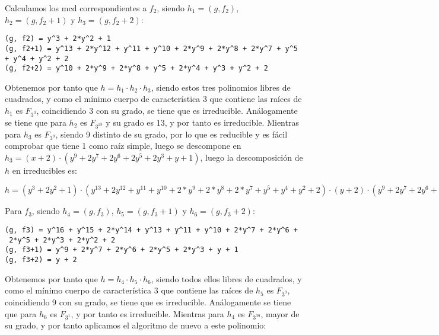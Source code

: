 \documentclass[a4paper]{article}
\begin{document}
Calculamos los mcd correspondientes a $f_2$, siendo $h_1=(g,f_2)$, $h_2=(g,f_2+1)$ y $h_3=(g,f_2+2)$:

\begin{verbatim}
(g, f2) = y^3 + 2*y^2 + 1
(g, f2+1) = y^13 + 2*y^12 + y^11 + y^10 + 2*y^9 + 2*y^8 + 2*y^7 + y^5 + y^4 + y^2 + 2
(g, f2+2) = y^10 + 2*y^9 + 2*y^8 + y^5 + 2*y^4 + y^3 + y^2 + 2
\end{verbatim}

Obtenemos por tanto que $h=h_1\cdot h_2\cdot h_3$, siendo estos tres polinomios libres de cuadrados, y como el mínimo cuerpo de característica 3 que contiene las raíces de $h_1$ es $F_{3^{3}}$, coincidiendo 3 con su grado, se tiene que es irreducible. Análogamente se tiene que para $h_2$ es $F_{3^{13}}$ y su grado es 13, y por tanto es irreducible. Mientras para $h_3$ es $F_{3^{9}}$, siendo 9 distinto de su grado, por lo que es reducible y es fácil comprobar que tiene 1 como raíz simple, luego se descompone en $h_3=(x+2)\cdot (y^9+2y^7+2y^6+2y^5+2y^3+y+1)$, luego la descomposición de $h$ en irreducibles es:

$h = (y^3 + 2y^2 + 1)\cdot (y^{13} + 2y^{12} + y^{11} + y^{10} + 2*y^9 + 2*y^8 + 2*y^7 + y^5 + y^4 + y^2 + 2)\cdot (y+2)\cdot (y^9 + 2y^7 + 2y^6 + 2y^5 + 2y^3 + y + 1)$

Para $f_3$, siendo $h_4=(g,f_3)$, $h_5=(g,f_3+1)$ y $h_6=(g,f_3+2)$:

\begin{verbatim}
(g, f3) = y^16 + y^15 + 2*y^14 + y^13 + y^11 + y^10 + 2*y^7 + 2*y^6 +
 2*y^5 + 2*y^3 + 2*y^2 + 2
(g, f3+1) = y^9 + 2*y^7 + 2*y^6 + 2*y^5 + 2*y^3 + y + 1
(g, f3+2) = y + 2
\end{verbatim}

Obtenemos por tanto que $h=h_4\cdot h_5\cdot h_6$, siendo todos ellos libres de cuadrados, y como el mínimo cuerpo de característica 3 que contiene las raíces de $h_5$ es $F_{3^{9}}$, coincidiendo 9 con su grado, se tiene que es irreducible. Análogamente se tiene que para $h_6$ es $F_{3^{1}}$, y por tanto es irreducible. Mientras para $h_4$ es $F_{3^{39}}$, mayor de su grado, y por tanto aplicamos el algoritmo de nuevo a este polinomio:
\end{document}
